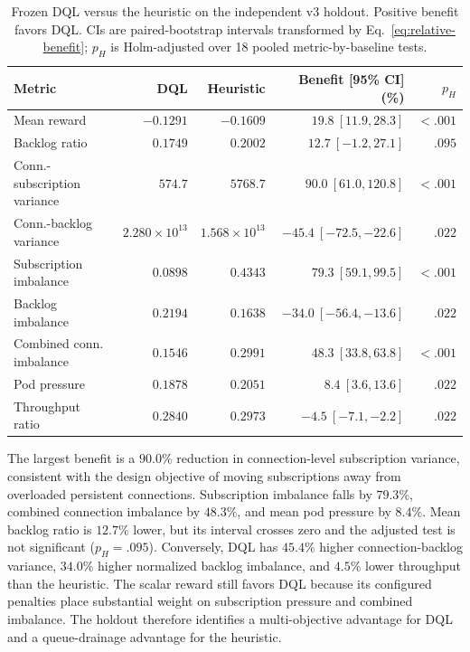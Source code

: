 \begin{table}[!htbp]
  \caption{Frozen DQL versus the heuristic on the independent v3 holdout.
  Positive benefit favors DQL.  CIs are paired-bootstrap intervals transformed
  by Eq.~\eqref{eq:relative-benefit}; $p_H$ is Holm-adjusted over 18 pooled
  metric-by-baseline tests.}
  \label{tab:v3-paired-effects}
  \centering
  \small
  \begin{tabular}{lrrrr}
    \toprule
    Metric & DQL & Heuristic & Benefit [95\% CI] (\%) & $p_H$ \\
    \midrule
    Mean reward & $-0.1291$ & $-0.1609$ & $19.8\ [11.9,28.3]$ & $<.001$ \\
    Backlog ratio & $0.1749$ & $0.2002$ & $12.7\ [-1.2,27.1]$ & $.095$ \\
    Conn.-subscription variance & $574.7$ & $5768.7$ & $90.0\ [61.0,120.8]$ & $<.001$ \\
    Conn.-backlog variance & $2.280\!\times\!10^{13}$ & $1.568\!\times\!10^{13}$ & $-45.4\ [-72.5,-22.6]$ & $.022$ \\
    Subscription imbalance & $0.0898$ & $0.4343$ & $79.3\ [59.1,99.5]$ & $<.001$ \\
    Backlog imbalance & $0.2194$ & $0.1638$ & $-34.0\ [-56.4,-13.6]$ & $.022$ \\
    Combined conn. imbalance & $0.1546$ & $0.2991$ & $48.3\ [33.8,63.8]$ & $<.001$ \\
    Pod pressure & $0.1878$ & $0.2051$ & $8.4\ [3.6,13.6]$ & $.022$ \\
    Throughput ratio & $0.2840$ & $0.2973$ & $-4.5\ [-7.1,-2.2]$ & $.022$ \\
    \bottomrule
  \end{tabular}
\end{table}

The largest benefit is a $90.0\%$ reduction in connection-level subscription
variance, consistent with the design objective of moving subscriptions away
from overloaded persistent connections.  Subscription imbalance falls by
$79.3\%$, combined connection imbalance by $48.3\%$, and mean pod pressure by
$8.4\%$.  Mean backlog ratio is $12.7\%$ lower, but its interval crosses zero
and the adjusted test is not significant ($p_H=.095$).  Conversely, DQL has
$45.4\%$ higher connection-backlog variance, $34.0\%$ higher normalized backlog
imbalance, and $4.5\%$ lower throughput than the heuristic.  The scalar reward
still favors DQL because its configured penalties place substantial weight on
subscription pressure and combined imbalance. The holdout therefore identifies
a multi-objective advantage for DQL and a queue-drainage advantage for the
heuristic.

